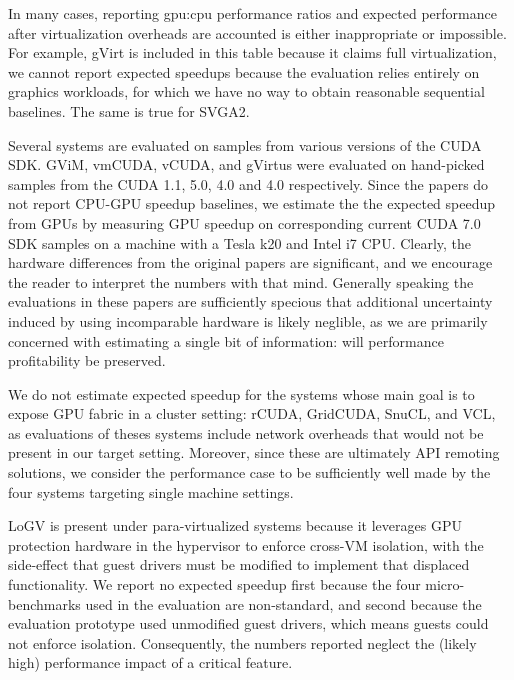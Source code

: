 In many cases, reporting gpu:cpu performance ratios and expected performance after virtualization
overheads are accounted is either inappropriate or impossible. For example, gVirt is included
in this table because it claims full virtualization, we cannot report expected
speedups because the evaluation relies entirely on graphics workloads, for which we have no way to
obtain reasonable sequential baselines. The same is true for SVGA2.

Several systems are evaluated on samples from various versions of the CUDA SDK.
GViM, vmCUDA, vCUDA, and gVirtus were evaluated on hand-picked samples from the CUDA 1.1, 5.0, 4.0 and 4.0
respectively. Since the papers do not report CPU-GPU speedup baselines, we estimate the
the expected speedup from GPUs by measuring GPU speedup on corresponding current CUDA 7.0 SDK
samples on a machine with a Tesla k20 and Intel i7 CPU. Clearly, the hardware differences from
the original papers are significant, and we encourage the reader to interpret the numbers with
that mind. Generally speaking the evaluations in these papers
are sufficiently specious that additional uncertainty induced by using
incomparable hardware is likely neglible, as we are primarily concerned with estimating a
single bit of information: will performance profitability be preserved.

We do not estimate expected speedup for the systems whose main goal is to expose GPU fabric in a
cluster setting: rCUDA, GridCUDA, SnuCL, and VCL, as evaluations of theses systems include
network overheads that would not be present in our target setting. Moreover, since these are
ultimately API remoting solutions, we consider the performance case to be sufficiently well
made by the four systems targeting single machine settings.

LoGV is present under para-virtualized systems because it leverages GPU protection hardware in the
hypervisor to enforce cross-VM isolation, with the side-effect that guest drivers must be modified
to implement that displaced functionality. We report no expected speedup first because the four micro-benchmarks
used in the evaluation are non-standard, and second because the evaluation prototype used unmodified
guest drivers, which means guests could not enforce isolation. Consequently, the numbers reported neglect
the (likely high) performance impact of a critical feature.
